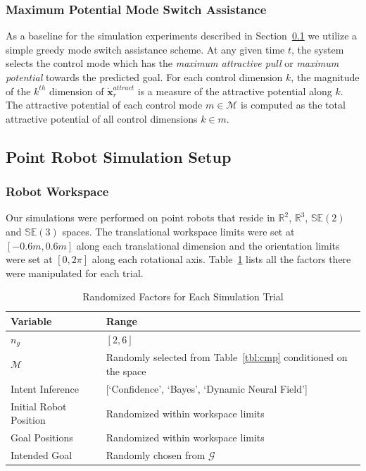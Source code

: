 \documentclass[conference]{IEEEtran}
\begin{document}
\subsubsection{Maximum Potential Mode Switch Assistance}\label{sssec:baseline}
As a baseline for the simulation experiments described in Section~\ref{ssec:sim} we utilize a simple greedy mode switch assistance scheme. At any given time $t$, the system selects the control mode which has the \textit{maximum attractive pull} or \textit{maximum potential} towards the predicted goal. For each control dimension $k$, the magnitude of the $k^{th}$ dimension of $\dot{\boldsymbol{x}}_r^{attract}$ is a measure of the attractive potential along $k$. The attractive potential of each control mode $m \in \mathcal{M}$ is computed as the total attractive potential of all control dimensions $k \in m$.

\subsection{Point Robot Simulation Setup}\label{ssec:sim}
\subsubsection{Robot Workspace}
Our simulations were performed on point robots that reside in $\mathbb{R}^2$, $\mathbb{R}^3$, $\mathbb{SE}(2)$ and $\mathbb{SE}(3)$ spaces. The translational workspace limits were set at $[-0.6m, 0.6m]$ along each translational dimension and the orientation limits were set at $[0, 2\pi]$ along each rotational axis. Table~\ref{tbl:manip} lists all the factors there were manipulated for each trial. 
\begin{table}[t]
	\centering
	\begin{tabular}{|p{3cm}|p{3cm}|}
		\hline
		\textbf{Variable} &\textbf{Range}  \\ \hline
		$n_g$ &  $[2,6]$ \\ \hline
		$\mathcal{M}$ & Randomly selected from Table~\ref{tbl:cmp} conditioned on the space\\ \hline
		Intent Inference & [`Confidence', `Bayes', `Dynamic Neural Field'] \\ \hline
		Initial Robot Position & Randomized within workspace limits \\ \hline
		Goal Positions & Randomized within workspace limits \\ \hline
		Intended Goal & Randomly chosen from $\mathcal{G}$ \\ \hline
	\end{tabular}
	\vspace{.2cm}
	\caption{Randomized Factors for Each Simulation Trial} 
	\label{tbl:manip}
	\vspace{-.5cm}
\end{table}
\end{document}
